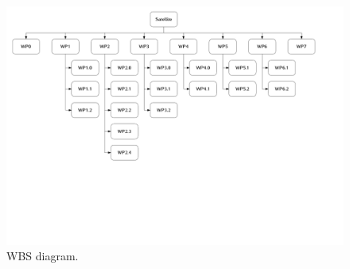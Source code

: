 \begin{figure}[!ht]
    \begin{center}
        \includegraphics[width=\textwidth]{figures/wbs.pdf}
        \caption{WBS diagram.}
        \label{fig:wbs}
    \end{center}
\end{figure}

